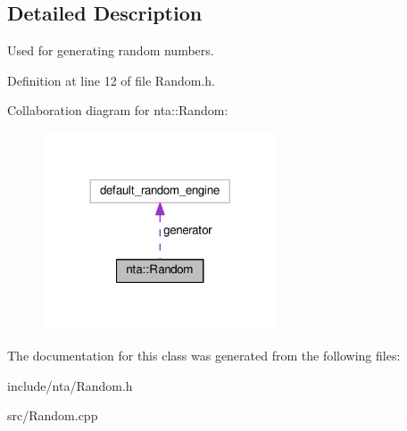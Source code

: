 \subsection{Detailed Description}
Used for generating random numbers. 

Definition at line 12 of file Random.\+h.



Collaboration diagram for nta\+:\+:Random\+:\nopagebreak
\begin{figure}[H]
\begin{center}
\leavevmode
\includegraphics[width=197pt]{de/dda/classnta_1_1Random__coll__graph}
\end{center}
\end{figure}


The documentation for this class was generated from the following files\+:\begin{DoxyCompactItemize}
\item 
include/nta/Random.\+h\item 
src/Random.\+cpp\end{DoxyCompactItemize}

